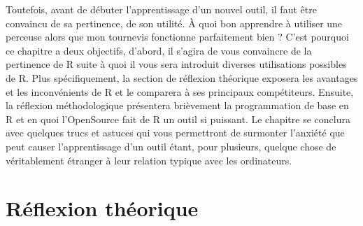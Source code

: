 \documentclass[
  letterpaper,
]{scrbook}
\begin{document}
Toutefois, avant de débuter l'apprentissage d'un nouvel outil, il faut
être convaincu de sa pertinence, de son utilité. À quoi bon apprendre à
utiliser une perceuse alors que mon tournevis fonctionne parfaitement
bien ? C'est pourquoi ce chapitre a deux objectifs, d'abord, il s'agira
de vous convaincre de la pertinence de R suite à quoi il vous sera
introduit diverses utilisations possibles de R. Plus spécifiquement, la
section de réflexion théorique exposera les avantages et les
inconvénients de R et le comparera à ses principaux compétiteurs.
Ensuite, la réflexion méthodologique présentera brièvement la
programmation de base en R et en quoi l'OpenSource fait de R un outil si
puissant. Le chapitre se conclura avec quelques trucs et astuces qui
vous permettront de surmonter l'anxiété que peut causer l'apprentissage
d'un outil étant, pour plusieurs, quelque chose de véritablement
étranger à leur relation typique avec les ordinateurs.

\hypertarget{ruxe9flexion-thuxe9orique}{%
\section{Réflexion théorique}\label{ruxe9flexion-thuxe9orique}}
\end{document}

